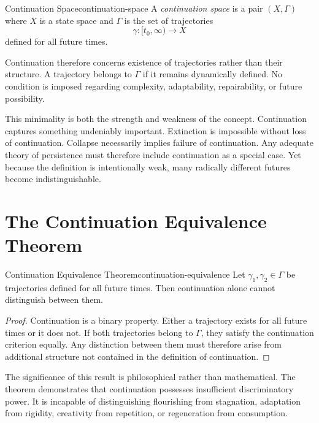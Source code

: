 \documentclass[12pt,twoside,openright]{book}
\begin{document}
\begin{definition}{Continuation Space}{continuation-space}
  A \emph{continuation space} is a pair $(X,\Gamma)$ where
  $X$ is a state space and $\Gamma$ is the set of
  trajectories
  \[
    \gamma : [t_0,\infty) \to X
  \]
  defined for all future times.
\end{definition}

Continuation therefore concerns existence of trajectories
rather than their structure. A trajectory belongs to
$\Gamma$ if it remains dynamically defined. No condition is
imposed regarding complexity, adaptability, repairability,
or future possibility.

This minimality is both the strength and weakness of the
concept. Continuation captures something undeniably
important. Extinction is impossible without loss of
continuation. Collapse necessarily implies failure of
continuation. Any adequate theory of persistence must
therefore include continuation as a special case. Yet
because the definition is intentionally weak, many radically
different futures become indistinguishable.

\section{The Continuation Equivalence Theorem}
\label{sec:ch10-equivalence}

\begin{theorem}{Continuation Equivalence Theorem}{continuation-equivalence}
  Let $\gamma_1,\gamma_2\in\Gamma$ be trajectories defined
  for all future times. Then continuation alone cannot
  distinguish between them.
\end{theorem}

\begin{proof}
  Continuation is a binary property. Either a trajectory
  exists for all future times or it does not. If both
  trajectories belong to $\Gamma$, they satisfy the
  continuation criterion equally. Any distinction between
  them must therefore arise from additional structure not
  contained in the definition of continuation.
\end{proof}

The significance of this result is philosophical rather
than mathematical. The theorem demonstrates that
continuation possesses insufficient discriminatory power.
It is incapable of distinguishing flourishing from
stagnation, adaptation from rigidity, creativity from
repetition, or regeneration from consumption.
\end{document}
